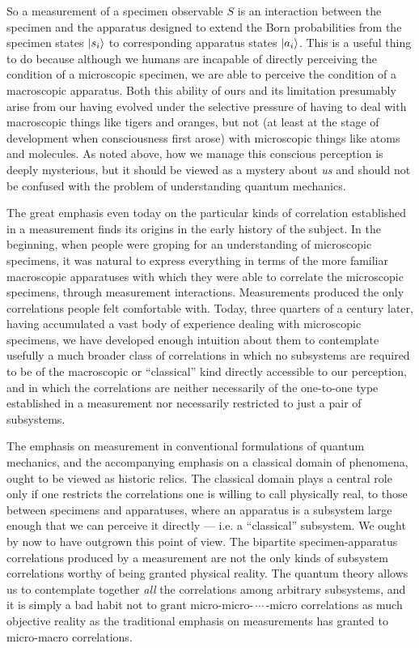 So a measurement of a specimen observable $S$ is an interaction
between the specimen and the apparatus designed to extend the Born
probabilities from the specimen states $|s_i\rangle$ to corresponding
apparatus states $|a_i\rangle$.  This is a useful thing to do because
although we humans are incapable of directly perceiving the condition
of a microscopic specimen, we are able to perceive the condition of a
macroscopic apparatus.  Both this ability of ours and its limitation
presumably arise from our having evolved under the selective pressure
of having to deal with macroscopic things like tigers and oranges, but
not (at least at the stage of development when consciousness first
arose) with microscopic things like atoms and molecules.  As noted
above, how we manage this conscious perception is deeply mysterious,
but it should be viewed as a mystery about {\it us\/} and should not be
confused with the problem of understanding quantum mechanics.

The great emphasis even today on the particular kinds of correlation
established in a measurement finds its origins in the early history of
the subject.  In the beginning, when people were groping for an
understanding of microscopic specimens, it was natural to express
everything in terms of the more familiar macroscopic apparatuses with
which they were able to correlate the microscopic specimens, through
measurement interactions.  Measurements produced the only correlations
people felt comfortable with.  Today, three quarters of a century
later, having accumulated a vast body of experience dealing with
microscopic specimens, we have developed enough intuition about them
to contemplate usefully a much broader class of correlations in which
no subsystems are required to be of the macroscopic or ``classical''
kind directly accessible to our perception, and in which the
correlations are neither necessarily of the one-to-one type
established in a measurement nor necessarily restricted to just a pair
of subsystems.  

The emphasis on measurement in conventional formulations of quantum
mechanics, and the accompanying emphasis on a classical domain of
phenomena, ought to be viewed as historic relics.  The classical
domain plays a central role only if one restricts the correlations one
is willing to call physically real, to those between specimens and
apparatuses, where an apparatus is a subsystem large enough that we
can perceive it directly --- i.e. a ``classical'' subsystem.  We ought
by now to have outgrown this point of view.  The bipartite
specimen-apparatus correlations produced by a measurement are not the
only kinds of subsystem correlations worthy of being granted physical
reality.  The quantum theory allows us to contemplate together {\it
all\/} the correlations among arbitrary subsystems, and it is simply a
bad habit not to grant micro-micro-$\,\cdots\,$-micro correlations as much
objective reality as the traditional emphasis on measurements has
granted to micro-macro correlations.  


